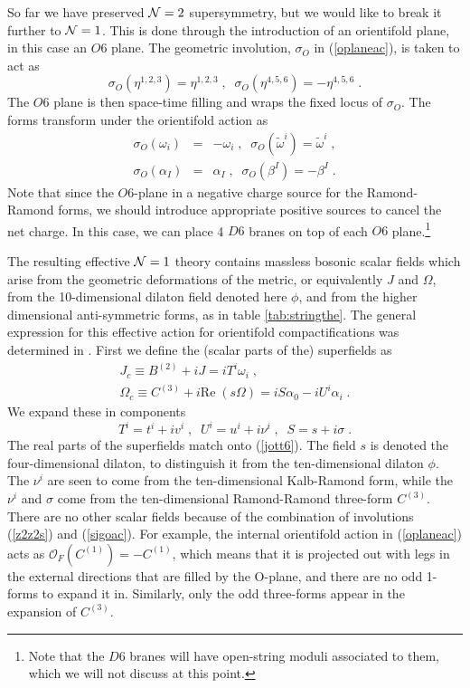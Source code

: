 \documentclass[11pt,a4paper]{article}
\numberwithin{equation}{section}
\numberwithin{table}{section}\setlength{\multlinegap}{25pt}
\newcommand{\bea}{\begin{eqnarray}}  \newcommand{\eea}{\end{eqnarray}}
\newcommand{\nn}{\nonumber}
\newcommand{\cO}{\mathcal{O}}
\newcommand{\be}{\begin{equation}}
\newcommand{\ee}{\end{equation}}
\begin{document}
So far we have preserved ${\cal N}=2$ supersymmetry, but we would like to break it further to ${\cal N}=1$. This is done through the introduction of an orientifold plane, in this case an $O6$ plane. The geometric involution, $\sigma_O$ in (\ref{oplaneac}), is taken to act as
\be
\sigma_O \left(\eta^{1,2,3}\right) = \eta^{1,2,3} \;, \;\; \sigma_O \left(\eta^{4,5,6}\right) = -\eta^{4,5,6} \;.
\label{sigoac}
\ee
The $O6$ plane is then space-time filling and wraps the fixed locus of $\sigma_O$. The forms transform under the orientifold action as
\bea
\sigma_O \left(\omega_i\right) &=& - \omega_i \;,\;\; \sigma_O \left(\tilde{\omega}^i \right)= \tilde{\omega}^i \;, \nn \\
\sigma_O \left(\alpha_I\right) &=& \alpha_I \;,\;\; \sigma_O \left(\beta^I\right) = -\beta^I \;.
\eea
Note that since the $O6$-plane in a negative charge source for the Ramond-Ramond forms, we should introduce appropriate positive sources to cancel the net charge. In this case, we can place 4 $D6$ branes on top of each $O6$ plane.\footnote{Note that the $D6$ branes will have open-string moduli associated to them, which we will not discuss at this point.}

The resulting effective ${\cal N}=1$ theory contains massless bosonic scalar fields which arise from the geometric deformations of the metric, or equivalently $J$ and $\Omega$, from the 10-dimensional dilaton field denoted here $\phi$, and from the higher dimensional anti-symmetric forms, as in table \ref{tab:stringthe}. The general expression for this effective action for orientifold compactifications was determined in \cite{Grimm:2004ua}. First we define the (scalar parts of the) superfields as
\bea
J_c \equiv B^{(2)} + i J = i T^i \omega_i \;, \nn \\
\Omega_c \equiv C^{(3)} + i \mathrm{Re\;} \left(s \Omega \right) = i S \alpha_0 - i U^i \alpha_i \;.
\label{def10JO}
\eea
We expand these in components
\be
T^i = t^i + i v^i  \;, \;\; U^i = u^i + i \nu^i \;,\;\; S = s + i \sigma \;.
\label{compsupiia} 
\ee
The real parts of the superfields match onto (\ref{jott6}). The field $s$ is denoted the four-dimensional dilaton, to distinguish it from the ten-dimensional dilaton $\phi$.  The $\nu^i$ are seen to come from the ten-dimensional Kalb-Ramond form, while the $\nu^i$ and $\sigma$ come from the ten-dimensional Ramond-Ramond three-form $C^{(3)}$.  There are no other scalar fields because of the combination of involutions (\ref{z2z2s}) and (\ref{sigoac}). For example, the internal orientifold action in (\ref{oplaneac}) acts as $\cO_{F}\left(C^{(1)}\right) = -C^{(1)}$, which means that it is projected out with legs in the external directions that are filled by the O-plane, and there are no odd 1-forms to expand it in. Similarly, only the odd three-forms appear in the expansion of $C^{(3)} $.
\end{document}
